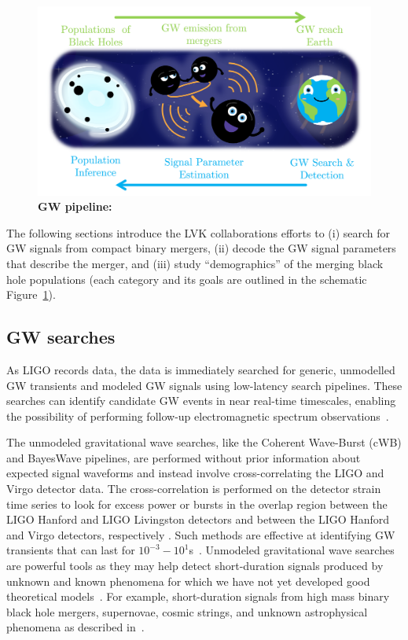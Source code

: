 \begin{figure}
\begin{center}
  \centerline{\includegraphics[width=1.1\linewidth]{src/figures/gw_pipeline.png}}
  \caption{\textbf{GW pipeline:}  }
  \label{fig:gw_pipeline}
\end{center}
\end{figure}

The following sections introduce the LVK collaborations efforts to (i) search for GW signals from compact binary mergers, (ii) decode the GW signal parameters that describe the merger, and (iii) study ``demographics'' of the merging black hole populations (each category and its goals are outlined in the schematic Figure~\ref{fig:gw_pipeline}).


\subsection{GW searches}  \label{sec:searches}

As LIGO records data, the data is immediately searched for generic, unmodelled GW transients and modeled GW signals using low-latency search pipelines. 
These searches can identify candidate GW events in near real-time timescales, enabling the possibility of performing follow-up electromagnetic spectrum observations~\cite{abbott2018prospects}.

The unmodeled gravitational wave searches, like the Coherent Wave-Burst (cWB) and BayesWave pipelines, are performed without prior information about expected signal waveforms and instead involve cross-correlating the LIGO and Virgo detector data. 
The cross-correlation is performed on the detector strain time series to look for excess power or bursts in the overlap region between the LIGO Hanford and LIGO Livingston detectors and between the LIGO Hanford and Virgo detectors, respectively \cite{LSC:2016}. 
Such methods are effective at identifying GW transients that can last for
$10^{-3}-10^{1}$s~\cite{abbott2016observing}. 
Unmodeled gravitational wave searches are powerful tools as they may help detect short-duration signals produced by unknown and known phenomena for which we have not yet developed good theoretical models~\cite{Abbott:2016blz}. 
For example, short-duration signals from high mass binary black hole mergers, supernovae, cosmic strings, and unknown astrophysical phenomena as described in~\citep{abbott2018prospects}.

